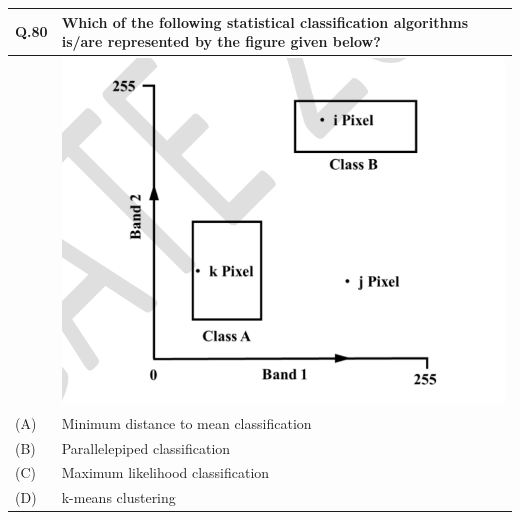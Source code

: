 \documentclass[12pt]{article}
\begin{document}
\begin{table}[H]
\renewcommand{\arraystretch}{3}
\setlength{\tabcolsep}{8pt}
\begin{tabular}{|l|p{15cm}|}
\hline

Q.80 &Which of the following statistical classification algorithms is/are represented by the
figure given below?\\ \hline
& \includegraphics[]{LatexImage12.png} \\ \hline
(A)&Minimum distance to mean classification\\ \hline
(B)&Parallelepiped classification\\ \hline
(C)&Maximum likelihood classification\\ \hline
(D)&k-means clustering\\ \hline


\end{tabular}
\end{table}

\newpage
\end{document}
